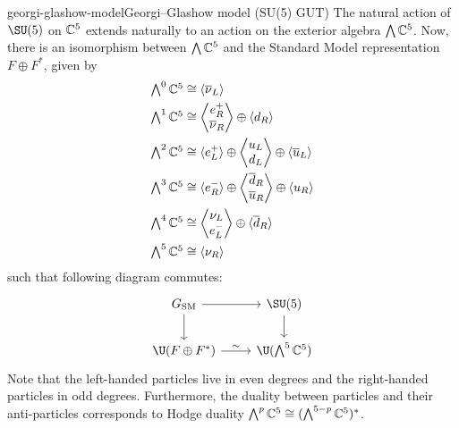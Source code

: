 \begin{topic}{georgi-glashow-model}{Georgi--Glashow model (SU(5) GUT)}
    The natural action of $\SU(5)$ on $\mathbb{C}^5$ extends naturally to an action on the exterior algebra $\bigwedge \mathbb{C}^5$. Now, there is an isomorphism between $\bigwedge \mathbb{C}^5$ and the Standard Model representation $F \oplus F^*$, given by
    \[ \begin{aligned}
        \textstyle \bigwedge^0 \mathbb{C}^5 &\cong \langle \overline{\nu}_L \rangle \\
        \textstyle \bigwedge^1 \mathbb{C}^5 &\cong \left\langle \begin{matrix} e^+_R \\ \overline{\nu}_R \end{matrix} \right\rangle \oplus \langle d_R \rangle \\
        \textstyle \bigwedge^2 \mathbb{C}^5 &\cong \langle e^+_L \rangle \oplus \left\langle \begin{matrix} u_L \\ d_L \end{matrix} \right\rangle \oplus \langle \overline{u}_L \rangle \\
        \textstyle \bigwedge^3 \mathbb{C}^5 &\cong \langle e^-_R \rangle \oplus \left\langle \begin{matrix} \overline{d}_R \\ \overline{u}_R \end{matrix} \right\rangle \oplus \langle u_R \rangle \\
        \textstyle \bigwedge^4 \mathbb{C}^5 &\cong \left\langle \begin{matrix} \nu_L \\ e^-_L \end{matrix} \right\rangle \oplus \langle \overline{d}_R \rangle \\
        \textstyle \bigwedge^5 \mathbb{C}^5 &\cong \langle \nu_R \rangle
    \end{aligned} \]
    such that following diagram commutes:
    \[ \svg \begin{tikzcd}
        G_\textup{SM} \arrow{r} \arrow{d} & \SU(5) \arrow{d} \\
        \U(F \oplus F^*) \arrow{r}{\sim{}} & \U(\bigwedge^5 \CC^5)
    \end{tikzcd} \]
    Note that the left-handed particles live in even degrees and the right-handed particles in odd degrees. Furthermore, the duality between particles and their anti-particles corresponds to Hodge duality $\bigwedge^p \mathbb{C}^5 \cong (\bigwedge^{5 - p} \mathbb{C}^5)^*$.
\end{topic}

    

    
